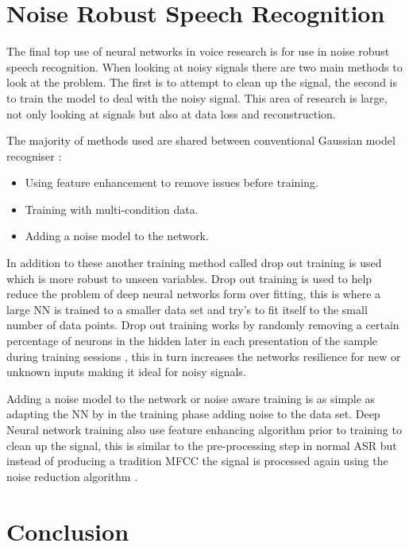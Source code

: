 \documentclass[11pt]{article}
\begin{document}
    \section{Noise Robust Speech Recognition}
    The final top use of neural networks in voice research is for use in noise robust speech recognition. When looking at noisy signals there are two main methods to look at the problem. The first is to attempt to clean up the signal, the second is to train the model to deal with the noisy signal. This area of research is large, not only looking at signals but also at data loss and reconstruction.
    
    The majority of methods used are shared between conventional Gaussian model recogniser \cite{Seltzer2013AnRecognition}:
    \begin{itemize}
        \item Using feature enhancement to remove issues before training.
        \item Training with multi-condition data.
        \item Adding a noise model to the network.
    \end{itemize}
    
    In addition to these another training method called drop out training is used which is more robust to unseen variables. Drop out training is used to help reduce the problem of deep neural networks form over fitting, this is where a large NN is trained to a smaller data set and try's to fit itself to the small number of data points. Drop out training works by randomly removing a certain percentage of neurons in the hidden later in each presentation of the sample during training sessions \cite{Hinton2012ImprovingDetectors}, this in turn increases the networks resilience for new or unknown inputs making it ideal for noisy signals. 
    
    Adding a noise model to the network or noise aware training is as simple as adapting the NN by in the training phase adding noise to the data set. Deep Neural network training also use feature enhancing algorithm prior to training to clean up the signal, this is similar to the pre-processing step in normal ASR but instead of producing a tradition MFCC the signal is processed again using the noise reduction algorithm \cite{YuARECOGNITION}.
    
    \pagebreak
    
    \section{Conclusion}
    
\end{document}
